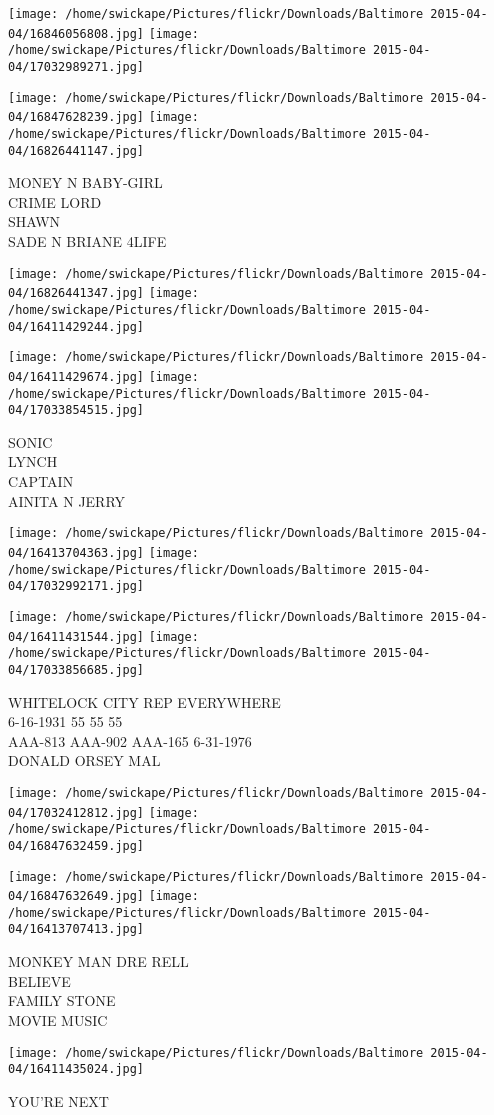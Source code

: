 \documentclass[10pt,letterpaper]{article}
\begin{document}
\texttt{[image: /home/swickape/Pictures/flickr/Downloads/Baltimore 2015-04-04/16846056808.jpg]}
\texttt{[image: /home/swickape/Pictures/flickr/Downloads/Baltimore 2015-04-04/17032989271.jpg]}

\texttt{[image: /home/swickape/Pictures/flickr/Downloads/Baltimore 2015-04-04/16847628239.jpg]}
\texttt{[image: /home/swickape/Pictures/flickr/Downloads/Baltimore 2015-04-04/16826441147.jpg]}

MONEY N BABY{-}GIRL\\
CRIME LORD\\
SHAWN\\
SADE N BRIANE 4LIFE
\pagebreak

\texttt{[image: /home/swickape/Pictures/flickr/Downloads/Baltimore 2015-04-04/16826441347.jpg]}
\texttt{[image: /home/swickape/Pictures/flickr/Downloads/Baltimore 2015-04-04/16411429244.jpg]}

\texttt{[image: /home/swickape/Pictures/flickr/Downloads/Baltimore 2015-04-04/16411429674.jpg]}
\texttt{[image: /home/swickape/Pictures/flickr/Downloads/Baltimore 2015-04-04/17033854515.jpg]}

SONIC\\
LYNCH\\
CAPTAIN\\
AINITA N JERRY
\pagebreak

\texttt{[image: /home/swickape/Pictures/flickr/Downloads/Baltimore 2015-04-04/16413704363.jpg]}
\texttt{[image: /home/swickape/Pictures/flickr/Downloads/Baltimore 2015-04-04/17032992171.jpg]}

\texttt{[image: /home/swickape/Pictures/flickr/Downloads/Baltimore 2015-04-04/16411431544.jpg]}
\texttt{[image: /home/swickape/Pictures/flickr/Downloads/Baltimore 2015-04-04/17033856685.jpg]}

WHITELOCK CITY REP EVERYWHERE\\
6{-}16{-}1931 55 55 55\\
AAA{-}813 AAA{-}902 AAA{-}165 6{-}31{-}1976\\
DONALD ORSEY MAL
\pagebreak

\texttt{[image: /home/swickape/Pictures/flickr/Downloads/Baltimore 2015-04-04/17032412812.jpg]}
\texttt{[image: /home/swickape/Pictures/flickr/Downloads/Baltimore 2015-04-04/16847632459.jpg]}

\texttt{[image: /home/swickape/Pictures/flickr/Downloads/Baltimore 2015-04-04/16847632649.jpg]}
\texttt{[image: /home/swickape/Pictures/flickr/Downloads/Baltimore 2015-04-04/16413707413.jpg]}

MONKEY MAN DRE RELL\\
BELIEVE\\
FAMILY STONE\\
MOVIE MUSIC
\pagebreak

\texttt{[image: /home/swickape/Pictures/flickr/Downloads/Baltimore 2015-04-04/16411435024.jpg]}

YOU'RE NEXT
\pagebreak
\end{document}
